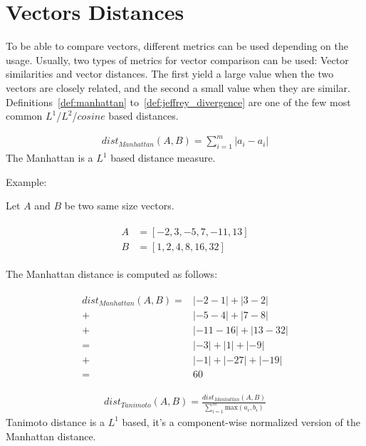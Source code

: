 \section{Vectors Distances \label{sec:vectors_distances}}

To be able to compare vectors, different metrics can be used depending on the usage.
Usually, two types of metrics for vector comparison can be used: Vector similarities and vector distances.
The first yield a large value when the two vectors are closely related, and the second a small value when they are similar.
Definitions~\ref{def:manhattan} to~\ref{def:jeffrey_divergence} are one of the few most common $L^1$/$L^2$/$cosine$ based distances.

\begin{definition}
  \begin{gather*}
    dist_{Manhattan}(A, B) = \sum_{i=1}^{m} |a_i - a_i|
  \end{gather*}
  The Manhattan is a $L^1$ based distance measure.

  Example:

  Let $A$ and $B$ be two same size vectors.

  \begin{gather*}
    \begin{aligned}
      A &= \left[-2, 3, -5, 7, -11, 13 \right] \\
      B &= \left[1, 2, 4, 8, 16, 32 \right]
    \end{aligned}
  \end{gather*}

  The Manhattan distance is computed as follows:

  \begin{gather*}
    \begin{aligned}
      dist_{Manhattan}(A, B) =& |-2 - 1| + |3 - 2| \\
                             +& |-5 - 4| + |7 - 8| \\
                             +& |-11 - 16| + |13 - 32| \\
                             =& |-3| + |1| + |-9| \\
                             +& |-1| + |-27| + |-19| \\
                             =& 60
    \end{aligned}
  \end{gather*}
\end{definition}

\begin{definition}
  \begin{gather*}
    dist_{Tanimoto}(A, B) = \frac{dist_{Manhattan}(A, B)}{\sum_{i=1}^{m} \mathrm{max}(a_i, b_i)}
  \end{gather*}
  Tanimoto distance is a $L^1$ based, it's a component-wise normalized version of the Manhattan distance.
\end{definition}


